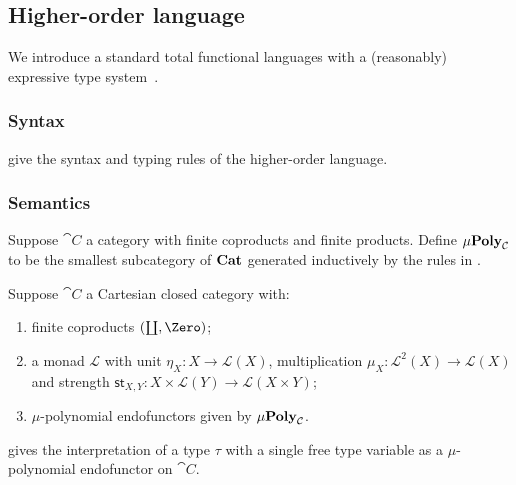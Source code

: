\subsection{Higher-order language}

We introduce a standard total functional languages with a (reasonably) expressive type
system~\cite{crole94,pitts01,santocanale02}.

\subsubsection{Syntax}





 give the syntax and typing rules of the higher-order language.

\subsubsection{Semantics}




\begin{definition}[$\mu$-polynomial]
Suppose $\cat{C}$ a category with finite coproducts and finite products. Define $\mu\mathbf{Poly}_{\mathcal{C}}$ to be the
smallest subcategory of $\mathbf{Cat}$ generated inductively by the rules in .
\end{definition}

Suppose $\cat{C}$ a Cartesian closed category with:
\begin{enumerate}
\item finite coproducts $(\coprod, \Zero)$;
\item a monad $\mathcal{L}$ with unit $\eta_X: X \to \mathcal{L}(X)$, multiplication $\mu_X: \mathcal{L}^2(X)
\to \mathcal{L}(X)$ and strength $\mathsf{st}_{X,Y}: X \times \mathcal{L}(Y) \to \mathcal{L}(X \times Y)$;
\item $\mu$-polynomial endofunctors given by $\mu\mathbf{Poly}_{\mathcal{C}}$.
\end{enumerate}
 gives the interpretation of a type $\tau$ with a single free type variable as
a $\mu$-polynomial endofunctor on $\cat{C}$.
